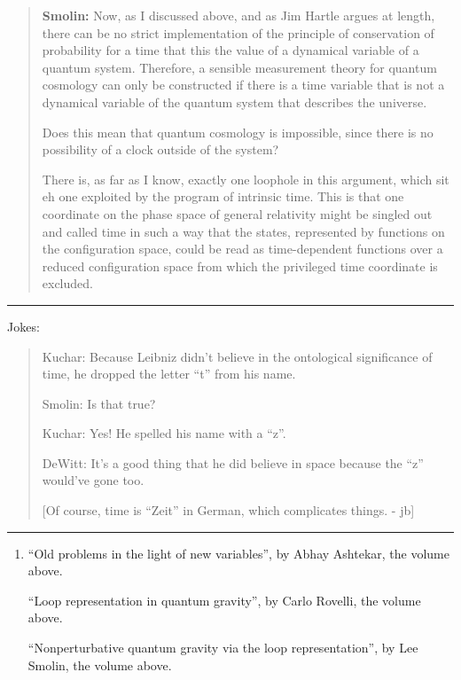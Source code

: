 \documentclass{article}
\begin{document}
\begin{quote}
\textbf{Smolin:} Now, as I discussed above, and as Jim Hartle argues at
length, there can be no strict implementation of the principle of
conservation of probability for a time that this the value of a
dynamical variable of a quantum system. Therefore, a sensible
measurement theory for quantum cosmology can only be constructed if
there is a time variable that is not a dynamical variable of the quantum
system that describes the universe.

Does this mean that quantum cosmology is impossible, since there is no
possibility of a clock outside of the system?

There is, as far as I know, exactly one loophole in this argument, which
sit eh one exploited by the program of intrinsic time. This is that one
coordinate on the phase space of general relativity might be singled out
and called time in such a way that the states, represented by functions
on the configuration space, could be read as time-dependent functions
over a reduced configuration space from which the privileged time
coordinate is excluded.
\end{quote}

\begin{center}\rule{0.5\linewidth}{0.5pt}\end{center}

Jokes:

\begin{quote}
Kuchar: Because Leibniz didn't believe in the ontological significance
of time, he dropped the letter ``t'' from his name.

Smolin: Is that true?

Kuchar: Yes! He spelled his name with a ``z''.

DeWitt: It's a good thing that he did believe in space because the ``z''
would've gone too.

{[}Of course, time is ``Zeit'' in German, which complicates things. -
jb{]}
\end{quote}

\begin{center}\rule{0.5\linewidth}{0.5pt}\end{center}

\begin{enumerate}
\def\labelenumi{\arabic{enumi})}
\setcounter{enumi}{3}
\item
  ``Old problems in the light of new variables'', by Abhay Ashtekar, the
  volume above.

  ``Loop representation in quantum gravity'', by Carlo Rovelli, the
  volume above.

  ``Nonperturbative quantum gravity via the loop representation'', by
  Lee Smolin, the volume above.
\end{enumerate}
\end{document}
